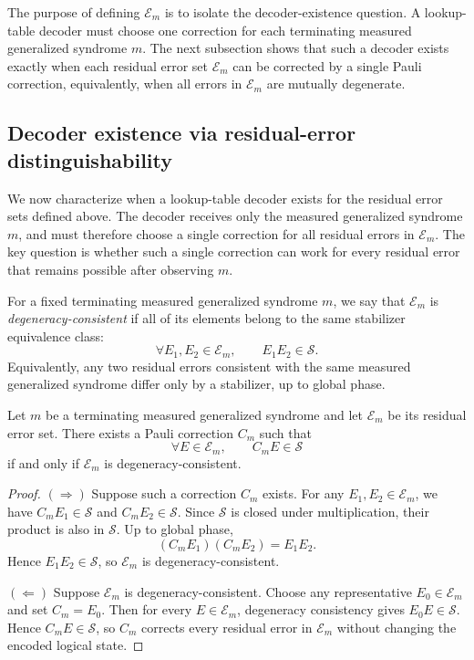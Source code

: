 \documentclass[acmsmall,screen,review,anonymous,nonacm]{acmart}
\begin{document}
The purpose of defining $\mathcal{E}_m$ is to isolate the decoder-existence question. A lookup-table decoder must choose one correction for each terminating measured generalized syndrome $m$. The next subsection shows that such a decoder exists exactly when each residual error set $\mathcal{E}_m$ can be corrected by a single Pauli correction, equivalently, when all errors in $\mathcal{E}_m$ are mutually degenerate.

\subsection{Decoder existence via residual-error distinguishability}

We now characterize when a lookup-table decoder exists for the residual error sets defined above. The decoder receives only the measured generalized syndrome $m$, and must therefore choose a single correction for all residual errors in $\mathcal{E}_m$. The key question is whether such a single correction can work for every residual error that remains possible after observing $m$.

For a fixed terminating measured generalized syndrome $m$, we say that $\mathcal{E}_m$ is \emph{degeneracy-consistent} if all of its elements belong to the same stabilizer equivalence class:
\[
  \forall E_1,E_2\in\mathcal{E}_m,\qquad E_1E_2\in\mathcal{S}.
\]
Equivalently, any two residual errors consistent with the same measured generalized syndrome differ only by a stabilizer, up to global phase.

\begin{lemma}
Let $m$ be a terminating measured generalized syndrome and let $\mathcal{E}_m$ be its residual error set. There exists a Pauli correction $C_m$ such that
\[
  \forall E\in\mathcal{E}_m,\qquad C_mE\in\mathcal{S}
\]
if and only if $\mathcal{E}_m$ is degeneracy-consistent.
\end{lemma}

\begin{proof}
$(\Rightarrow)$ Suppose such a correction $C_m$ exists. For any $E_1,E_2\in\mathcal{E}_m$, we have $C_mE_1\in\mathcal{S}$ and $C_mE_2\in\mathcal{S}$. Since $\mathcal{S}$ is closed under multiplication, their product is also in $\mathcal{S}$. Up to global phase,
\[
  (C_mE_1)(C_mE_2)=E_1E_2.
\]
Hence $E_1E_2\in\mathcal{S}$, so $\mathcal{E}_m$ is degeneracy-consistent.

$(\Leftarrow)$ Suppose $\mathcal{E}_m$ is degeneracy-consistent. Choose any representative $E_0\in\mathcal{E}_m$ and set $C_m=E_0$. Then for every $E\in\mathcal{E}_m$, degeneracy consistency gives $E_0E\in\mathcal{S}$. Hence $C_mE\in\mathcal{S}$, so $C_m$ corrects every residual error in $\mathcal{E}_m$ without changing the encoded logical state.
\end{proof}
\end{document}
